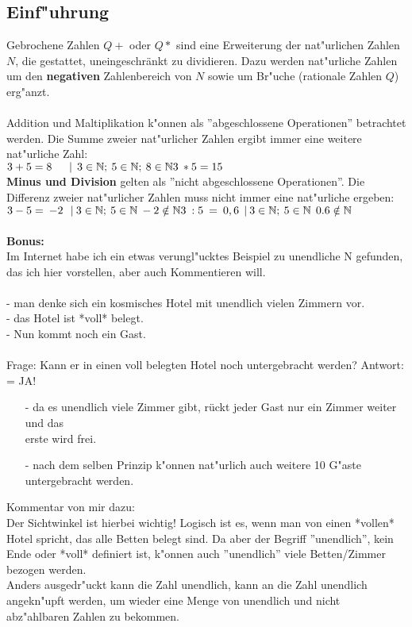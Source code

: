 \subsection{Einf"uhrung}
Gebrochene Zahlen $Q+$ oder $Q*$ sind eine Erweiterung der nat"urlichen
Zahlen $N$, die gestattet, uneingeschränkt zu dividieren.
Dazu werden nat"urliche Zahlen um den \textbf{negativen} Zahlenbereich von
$N$ sowie um Br"uche (rationale Zahlen $Q$) erg"anzt.\\
\\
Addition und Maltiplikation k"onnen als ''abgeschlossene Operationen'' betrachtet werden.
Die Summe zweier nat"urlicher Zahlen ergibt immer eine weitere nat"urliche Zahl:
\\
$3 + 5 = 8 \:\:\:\:\:\:\: | \:\: 3 \in \mathbb{N}; \: 5 \in \mathbb{N}; \: 8 \in \mathbb{N} \\
3 \: * 5 = 15 $
\\
\textbf{Minus und Division} gelten als ''nicht abgeschlossene Operationen''.
Die Differenz zweier nat"urlicher Zahlen muss nicht immer eine
nat"urliche ergeben:
\\
$3 - 5 = \: -2 \: \: \: | \: 3 \in \mathbb{N}; \: 5 \in \mathbb{N} \: -2 \notin \mathbb{N} \\
3 \: : 5 \: = \: 0,6 \: \: | \: 3 \in \mathbb{N}; \: 5 \in \mathbb{N} \:\: 0.6 \notin \mathbb{N}$\\
\\
\textbf{Bonus:}\\
Im Internet habe ich ein etwas verungl"ucktes Beispiel
zu unendliche N gefunden, das ich hier vorstellen, aber auch
Kommentieren will.\\
\\
- man denke sich ein kosmisches Hotel mit unendlich vielen
  Zimmern vor.\\
- das Hotel ist *voll* belegt.\\
- Nun kommt noch ein Gast.\\
\\
Frage: Kann er in einen voll belegten Hotel noch untergebracht
werden?
Antwort: = JA! \\

\begin{itemize}
        \item[-] da es unendlich viele Zimmer gibt, rückt jeder Gast nur ein
          Zimmer weiter und das \\
	  erste wird frei.
        \item[-] nach dem selben Prinzip k"onnen nat"urlich auch weitere 10 G"aste
          untergebracht werden.
\end{itemize}
        Kommentar von mir dazu:\\
        Der Sichtwinkel ist hierbei wichtig!
        Logisch ist es, wenn man von einen *vollen* Hotel spricht, das
        alle Betten belegt sind.
        Da aber der Begriff ''unendlich'', kein Ende oder *voll* definiert
        ist, k"onnen auch ''unendlich'' viele Betten/Zimmer bezogen werden.\\
        Anders ausgedr"uckt kann  die Zahl unendlich, kann an die Zahl
        unendlich angekn"upft werden, um wieder eine Menge von unendlich
        und nicht abz"ahlbaren Zahlen zu bekommen.

